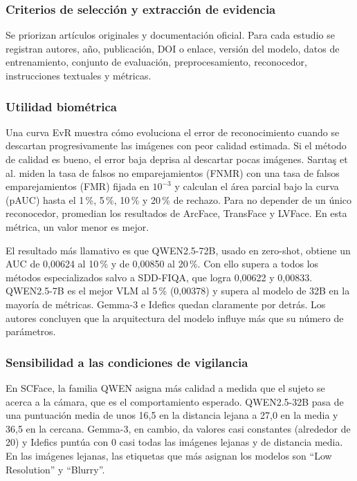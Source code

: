 \subsubsection{Criterios de selección y extracción de evidencia}
Se priorizan artículos originales y documentación oficial. Para cada estudio se registran autores, año, publicación, DOI o enlace, versión del modelo, datos de entrenamiento, conjunto de evaluación, preprocesamiento, reconocedor, instrucciones textuales y métricas.

\subsubsection{Utilidad biométrica}
\label{sec:utilidad}
Una curva EvR muestra cómo evoluciona el error de reconocimiento cuando se descartan progresivamente las imágenes con peor calidad estimada. Si el método de calidad es bueno, el error baja deprisa al descartar pocas imágenes. Sarıtaş et al. miden la tasa de falsos no emparejamientos (FNMR) con una tasa de falsos emparejamientos (FMR) fijada en $10^{-3}$ y calculan el área parcial bajo la curva (pAUC) hasta el 1\,\%, 5\,\%, 10\,\% y 20\,\% de rechazo. Para no depender de un único reconocedor, promedian los resultados de ArcFace, TransFace y LVFace. En esta métrica, un valor menor es mejor.

El resultado más llamativo es que QWEN2.5-72B, usado en zero-shot, obtiene un AUC de 0,00624 al 10\,\% y de 0,00850 al 20\,\%. Con ello supera a todos los métodos especializados salvo a SDD-FIQA, que logra 0,00622 y 0,00833. QWEN2.5-7B es el mejor VLM al 5\,\% (0,00378) y supera al modelo de 32B en la mayoría de métricas. Gemma-3 e Idefics quedan claramente por detrás. Los autores concluyen que la arquitectura del modelo influye más que su número de parámetros.

\subsubsection{Sensibilidad a las condiciones de vigilancia}
En SCFace, la familia QWEN asigna más calidad a medida que el sujeto se acerca a la cámara, que es el comportamiento esperado. QWEN2.5-32B pasa de una puntuación media de unos 16,5 en la distancia lejana a 27,0 en la media y 36,5 en la cercana. Gemma-3, en cambio, da valores casi constantes (alrededor de 20) y Idefics puntúa con 0 casi todas las imágenes lejanas y de distancia media. En las imágenes lejanas, las etiquetas que más asignan los modelos son ``Low Resolution'' y ``Blurry''.

